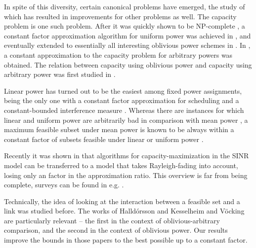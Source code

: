 \documentclass[11pt]{amsart}
\begin{document}
In spite of this diversity, certain canonical problems have emerged, the study of which has resulted in improvements for other problems as well.
The capacity problem is one such problem. After it was quickly
shown to be NP-complete \cite{gouss2007a},  a constant factor approximation 
algorithm for uniform power was achieved in \cite{GHWW09,HW09}, and eventually
extended to essentially all interesting oblivious power schemes in \cite{SODA11}.
In \cite{KesselheimSoda11,KesselheimESA12}, a constant approximation to the capacity problem for arbitrary powers was obtained. 
The relation between capacity using oblivious power and capacity using arbitrary
power was first studied in \cite{us:esa09full}.







Linear power has turned out to be the easiest among fixed power assignments, 
being the only one with a constant factor approximation for
scheduling \cite{FKV09,Tigran11} and a constant-bounded interference measure \cite{FKV09}. Whereas there are instances for
which linear and uniform power are arbitrarily bad in comparison with
mean power \cite{MoWa06}, a maximum feasible subset under mean power
is known to be always within a constant factor of subsets feasible under linear or
uniform power \cite{Tigran11a}.
\iffalse
Capacity maximization has recently been studied with respect to several limitations. E.g. \cite{ALP09} investigated the capacity with uniform and non-uniform power-assignments when the network resources are restricted, \cite{fanghanel2010online} studies an online-version of capacity maximization with respect to SINR-constraints. In \cite{katz2010energy} a tradeoff between energy minimization and maximizing the capacity in the SINR. 
\fi
Recently it was shown in \cite{dams2012scheduling} that algorithms for
capacity-maximization in the SINR model can be transferred to a model
that takes Rayleigh-fading into account, losing only an  factor in the approximation ratio. 
This overview is far from being complete, surveys can be found in e.g.  \cite{GoussevskaiaPW10}.

Technically, the idea of looking at the interaction between a feasible
set and a link was studied before. The works of Halld\'orsson \cite{us:esa09full}
and Kesselheim and V\"ocking \cite{KV10} are particularly relevant -- the
first in the context of oblivious-arbitrary comparison, and the second
in the context of oblivious power. Our results improve the bounds in
those papers to the best possible up to a constant factor.
\end{document}

